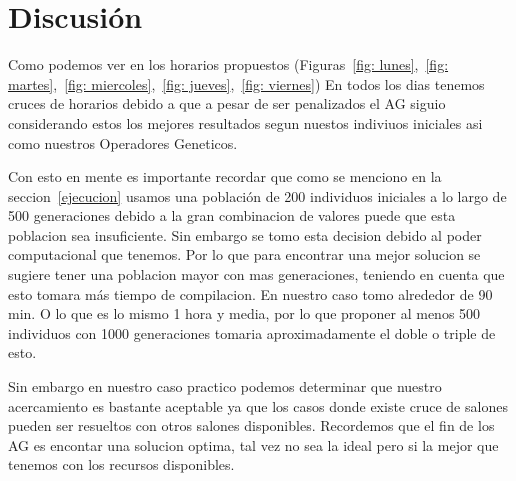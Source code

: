 \section{Discusión}
Como podemos ver en los horarios propuestos (Figuras~\ref{fig: lunes},~\ref{fig: martes},~\ref{fig: miercoles},~\ref{fig: jueves},~\ref{fig: viernes})
En todos los dias tenemos cruces de horarios debido a que a pesar de ser penalizados el AG siguio considerando estos los mejores resultados
segun nuestos indiviuos iniciales asi como nuestros Operadores Geneticos.

Con esto en mente es importante recordar que como se menciono en la seccion~\ref{ejecucion} usamos una población de 200 individuos iniciales
a lo largo de 500 generaciones debido a la gran combinacion de valores puede que esta poblacion sea insuficiente. Sin embargo se tomo esta decision
debido al poder computacional que tenemos. Por lo que para encontrar una mejor solucion se sugiere tener una poblacion mayor con mas generaciones,
teniendo en cuenta que esto tomara más tiempo de compilacion. En nuestro caso tomo alrededor de 90 min. O lo que es lo mismo 1 hora y media, por lo que
proponer al menos 500 individuos con 1000 generaciones tomaria aproximadamente el doble o triple de esto.

Sin embargo en nuestro caso practico podemos determinar que nuestro acercamiento es bastante aceptable ya que los casos donde existe cruce de salones
pueden ser resueltos con otros salones disponibles. Recordemos que el fin de los AG es encontar una solucion optima, tal vez no sea la ideal
pero si la mejor que tenemos con los recursos disponibles.